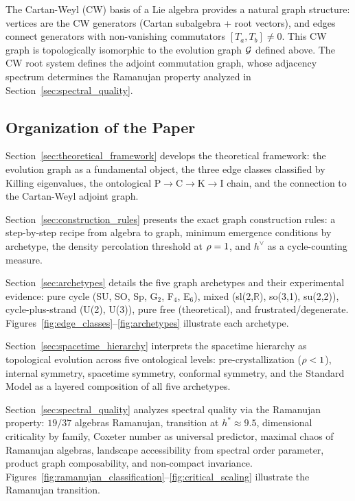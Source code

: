 The Cartan-Weyl (CW) basis of a Lie algebra provides a natural graph structure: vertices are the CW generators (Cartan subalgebra + root vectors), and edges connect generators with non-vanishing commutators $[T_a, T_b] \neq 0$. This CW graph is topologically isomorphic to the evolution graph $\mathcal{G}$ defined above. The CW root system defines the adjoint commutation graph, whose adjacency spectrum determines the Ramanujan property analyzed in Section~\ref{sec:spectral_quality}.

\subsection{Organization of the Paper}\label{sec:organization}

Section~\ref{sec:theoretical_framework} develops the theoretical framework: the evolution graph as a fundamental object, the three edge classes classified by Killing eigenvalues, the ontological P$\to$C$\to$K$\to$I chain, and the connection to the Cartan-Weyl adjoint graph.

Section~\ref{sec:construction_rules} presents the exact graph construction rules: a step-by-step recipe from algebra to graph, minimum emergence conditions by archetype, the density percolation threshold at $\rho = 1$, and $h^\vee$ as a cycle-counting measure.

Section~\ref{sec:archetypes} details the five graph archetypes and their experimental evidence: pure cycle (SU, SO, Sp, G$_2$, F$_4$, E$_6$), mixed (sl(2,$\mathbb{R}$), so(3,1), su(2,2)), cycle-plus-strand (U(2), U(3)), pure free (theoretical), and frustrated/degenerate. Figures~\ref{fig:edge_classes}--\ref{fig:archetypes} illustrate each archetype.

Section~\ref{sec:spacetime_hierarchy} interprets the spacetime hierarchy as topological evolution across five ontological levels: pre-crystallization ($\rho < 1$), internal symmetry, spacetime symmetry, conformal symmetry, and the Standard Model as a layered composition of all five archetypes.

Section~\ref{sec:spectral_quality} analyzes spectral quality via the Ramanujan property: $19/37$ algebras Ramanujan, transition at $h^* \approx 9.5$, dimensional criticality by family, Coxeter number as universal predictor, maximal chaos of Ramanujan algebras, landscape accessibility from spectral order parameter, product graph composability, and non-compact invariance. Figures~\ref{fig:ramanujan_classification}--\ref{fig:critical_scaling} illustrate the Ramanujan transition.

